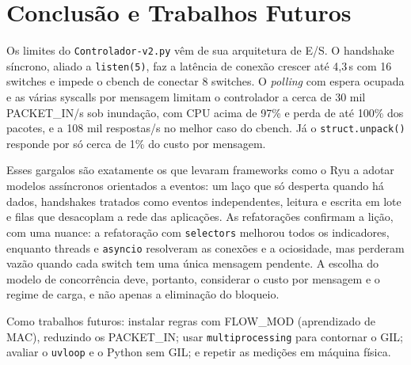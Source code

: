 \documentclass[12pt]{article}
\begin{document}
\section{Conclusão e Trabalhos Futuros}
\label{sec:conclusao}
Os limites do \texttt{Controlador-v2.py} vêm de sua arquitetura de E/S. O handshake síncrono, aliado a
\texttt{listen(5)}, faz a latência de conexão crescer até 4,3\,s com 16 switches e
impede o cbench de conectar 8 switches. O \textit{polling} com espera ocupada e as
várias syscalls por mensagem limitam o controlador a cerca de 30 mil PACKET\_IN/s sob
inundação, com CPU acima de 97\% e perda de até 100\% dos pacotes, e a 108 mil
respostas/s no melhor caso do cbench. Já o \texttt{struct.unpack()} responde por só cerca de 1\% do custo por mensagem.

Esses gargalos são exatamente os que levaram frameworks como o Ryu a adotar modelos
assíncronos orientados a eventos: um laço que só desperta quando há dados, handshakes
tratados como eventos independentes, leitura e escrita em lote e filas que desacoplam a
rede das aplicações. As refatorações confirmam a lição, com uma nuance: a refatoração
com \texttt{selectors} melhorou todos os indicadores, enquanto threads e
\texttt{asyncio} resolveram as conexões e a ociosidade, mas perderam vazão quando cada
switch tem uma única mensagem pendente. A escolha do modelo de concorrência deve,
portanto, considerar o custo por mensagem e o regime de carga, e não apenas a
eliminação do bloqueio.

Como trabalhos futuros: instalar regras com FLOW\_MOD (aprendizado de MAC), reduzindo
os PACKET\_IN; usar \texttt{multiprocessing} para contornar o GIL; avaliar o
\texttt{uvloop} e o Python sem GIL; e repetir as medições em máquina física.



\end{document}
